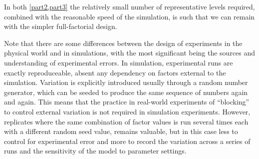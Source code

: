 In both \cref{part2,part3} the relatively small number of representative levels required, combined with the reasonable speed of the simulation, is such that we can remain with the simpler full-factorial design.

Note that there are some differences between the design of experiments in the physical world and in simulations, with the most significant being the sources and understanding of experimental errors. In simulation, experimental runs are exactly reproduceable, absent any dependency on factors external to the simulation. Variation is explicitly introduced usually through a random number generator, which can be seeded to produce the same sequence of numbers again and again. This means that the practice in real-world experiments of ``blocking'' to control external variation is not required in simulation experiments. However, \gls{replicate}s where the same combination of factor values is run several times each with a different random seed value, remains valuable, but in this case less to control for experimental error and more to record the variation across a series of runs and the sensitivity of the model to parameter settings.
